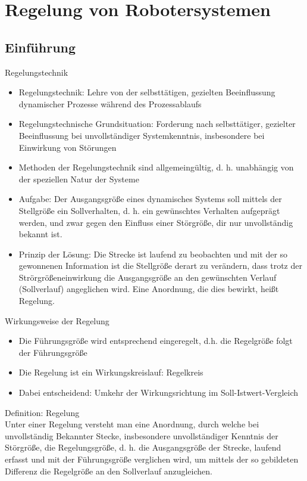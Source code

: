 \documentclass[paper=a4, fontsize=11pt]{scrartcl} %
\numberwithin{equation}{section} %
\numberwithin{figure}{section} %
\numberwithin{table}{section} %
\begin{document}
\section{Regelung von Robotersystemen}

\subsection{Einführung}

Regelungstechnik
\begin{itemize}
\item Regelungstechnik: Lehre von der selbsttätigen, gezielten Beeinflussung dynamischer Prozesse während des Prozessablaufs
\item Regelungstechnische Grundsituation: Forderung nach selbsttätiger, gezielter Beeinflussung bei unvollständiger Systemkenntnis, insbesondere bei Einwirkung von Störungen
\item Methoden der Regelungstechnik sind allgemeingültig, d. h. unabhängig von der speziellen Natur der Systeme
\item Aufgabe: Der Ausgangsgröße eines dynamisches Systems soll mittels der Stellgröße ein Sollverhalten, d. h. ein gewünschtes Verhalten aufgeprägt werden, und zwar gegen den Einfluss einer Störgröße, dir nur unvollständig bekannt ist.
\item Prinzip der Lösung: Die Strecke ist laufend zu beobachten und mit der so gewonnenen Information ist die Stellgröße derart zu verändern, dass trotz der Strörgrößeneinwirkung die Ausgangsgröße an den gewünschten Verlauf (Sollverlauf) angeglichen wird. Eine Anordnung, die dies bewirkt, heißt Regelung.
\end{itemize}

Wirkungsweise der Regelung
\begin{itemize}
\item Die Führungsgröße wird entsprechend eingeregelt, d.h. die Regelgröße folgt der Führungsgröße
\item Die Regelung ist ein Wirkungskreislauf: Regelkreis
\item Dabei entscheidend: Umkehr der Wirkungsrichtung im Soll-Istwert-Vergleich
\end{itemize}

Definition: Regelung\\
Unter einer Regelung versteht man eine Anordnung, durch welche bei unvollständig Bekannter Stecke, insbesondere unvollständiger Kenntnis der Störgröße, die Regelungsgröße, d. h. die Ausgangsgröße der Strecke, laufend erfasst und mit der Führungsgröße verglichen wird, um mittels der so gebildeten Differenz die Regelgröße an den Sollverlauf anzugleichen.
\end{document}
